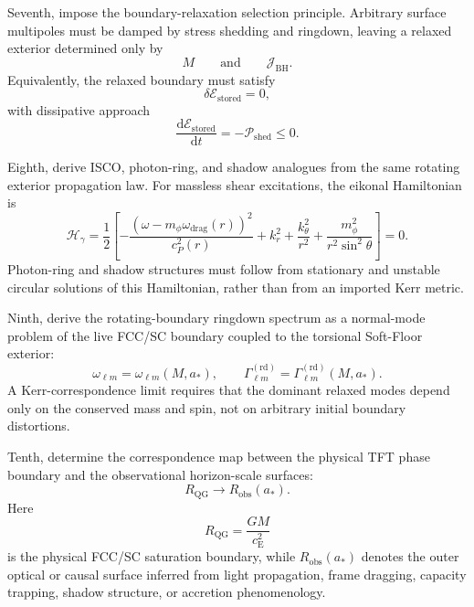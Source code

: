 Seventh, impose the boundary-relaxation selection principle. Arbitrary surface multipoles must be damped by stress shedding and ringdown, leaving a relaxed exterior determined only by
\begin{equation}
    M \qquad \text{and} \qquad \mathcal{J}_{\mathrm{BH}}.
\end{equation}
Equivalently, the relaxed boundary must satisfy
\begin{equation}
    \delta \mathcal{E}_{\mathrm{stored}} = 0,
\end{equation}
with dissipative approach
\begin{equation}
    \frac{\mathrm{d}\mathcal{E}_{\mathrm{stored}}}{\mathrm{d}t} = - \mathcal{P}_{\mathrm{shed}} \leq 0.
\end{equation}

Eighth, derive ISCO, photon-ring, and shadow analogues from the same rotating exterior propagation law. For massless shear excitations, the eikonal Hamiltonian is
\begin{equation}
    \mathcal{H}_{\gamma} = \frac{1}{2} \left[ - \frac{ \left( \omega - m_{\phi}\omega_{\mathrm{drag}}(r) \right)^2 }{ c_P^2(r) } + k_r^2 + \frac{k_{\theta}^2}{r^2} + \frac{m_{\phi}^2}{r^2\sin^2\theta} \right] = 0.
\end{equation}
Photon-ring and shadow structures must follow from stationary and unstable circular solutions of this Hamiltonian, rather than from an imported Kerr metric.

Ninth, derive the rotating-boundary ringdown spectrum as a normal-mode problem of the live FCC/SC boundary coupled to the torsional Soft-Floor exterior:
\begin{equation}
    \omega_{\ell m} = \omega_{\ell m}(M,a_\ast), \qquad \Gamma_{\ell m}^{(\mathrm{rd})} = \Gamma_{\ell m}^{(\mathrm{rd})}(M,a_\ast).
\end{equation}
A Kerr-correspondence limit requires that the dominant relaxed modes depend only on the conserved mass and spin, not on arbitrary initial boundary distortions.

Tenth, determine the correspondence map between the physical TFT phase boundary and the observational horizon-scale surfaces:
\begin{equation}
    R_{\mathrm{QG}} \longrightarrow R_{\mathrm{obs}}(a_\ast).
\end{equation}
Here
\begin{equation}
    R_{\mathrm{QG}} = \frac{GM}{c_{\mathrm{E}}^2}
\end{equation}
is the physical FCC/SC saturation boundary, while $R_{\mathrm{obs}}(a_\ast)$ denotes the outer optical or causal surface inferred from light propagation, frame dragging, capacity trapping, shadow structure, or accretion phenomenology.

